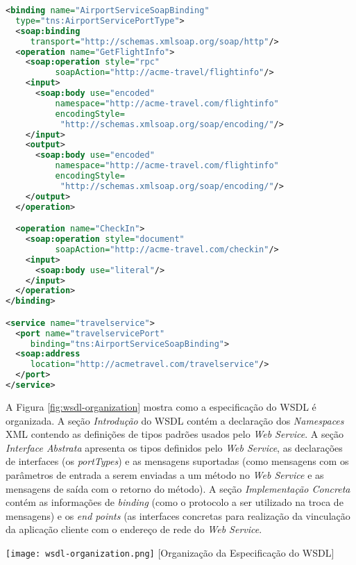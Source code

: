 \begin{lstlisting}[language=xml]
<binding name="AirportServiceSoapBinding"
  type="tns:AirportServicePortType">
  <soap:binding 
     transport="http://schemas.xmlsoap.org/soap/http"/>
  <operation name="GetFlightInfo">
    <soap:operation style="rpc"
          soapAction="http://acme-travel/flightinfo"/>
    <input>
      <soap:body use="encoded"
          namespace="http://acme-travel.com/flightinfo"
          encodingStyle=
           "http://schemas.xmlsoap.org/soap/encoding/"/>
    </input>
    <output>
      <soap:body use="encoded"
          namespace="http://acme-travel.com/flightinfo"
          encodingStyle=
           "http://schemas.xmlsoap.org/soap/encoding/"/>
    </output>
  </operation>

  <operation name="CheckIn">
    <soap:operation style="document"
          soapAction="http://acme-travel.com/checkin"/>
    <input>
      <soap:body use="literal"/>
    </input>
  </operation>
</binding>

<service name="travelservice">
  <port name="travelservicePort"
     binding="tns:AirportServiceSoapBinding">
  <soap:address 
     location="http://acmetravel.com/travelservice"/>
  </port>
</service>
\end{lstlisting}

A Figura \ref{fig:wsdl-organization} mostra como a especificação do WSDL é organizada.
A seção \textit{Introdução} do WSDL contém a declaração dos \textit{Namespaces} XML contendo as definições
de tipos padrões usados pelo \textit{Web Service}. A seção \textit{Interface Abstrata}
apresenta os tipos definidos pelo \textit{Web Service}, as declarações de interfaces (os \textit{portTypes})
e as mensagens suportadas (como mensagens com os parâmetros de entrada a serem enviadas a um método no \textit{Web Service}
e as mensagens de saída com o retorno do método).
A seção \textit{Implementação Concreta} contém as informações de \textit{binding} (como o protocolo a
ser utilizado na troca de mensagens) e os \textit{end points} (as interfaces
concretas para realização da vinculação da aplicação cliente com o endereço de rede do \textit{Web Service}.

\begin{center}
	\texttt{[image: wsdl-organization.png]}
	[Organização da Especificação do WSDL]{}
	\label{fig:wsdl-organization}
\end{center}



